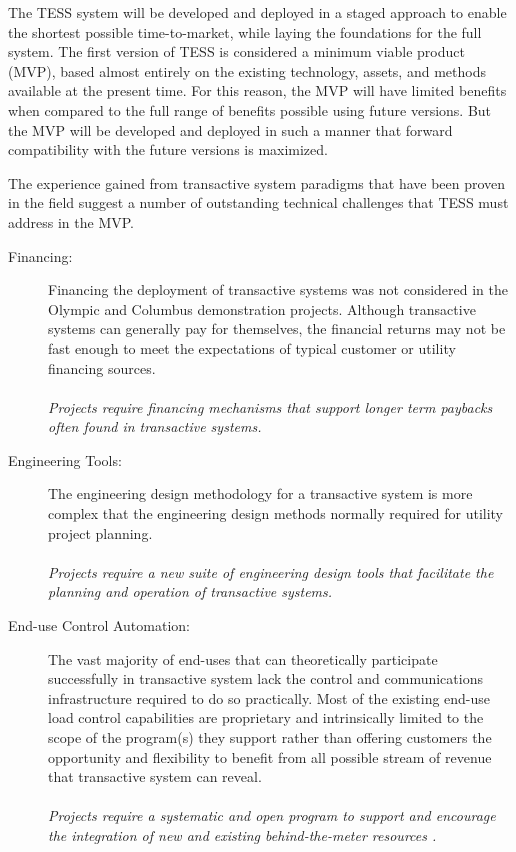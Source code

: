 \documentclass[10pt,twocolumn]{article}
\begin{document}
The TESS system will be developed and deployed in a staged approach to enable the shortest possible time-to-market, while laying the foundations for the full system.  The first version of TESS is considered a minimum viable product (MVP), based almost entirely on the existing technology, assets, and methods available at the present time. For this reason, the MVP will have limited benefits when compared to the full range of benefits possible using future versions.  But the MVP will be developed and deployed in such a manner that forward compatibility with the future versions is maximized.

The experience gained from transactive system paradigms that have been proven in the field suggest a number of outstanding technical challenges that TESS must address in the MVP.  

\begin{description}

    \item[Financing:] Financing the deployment of transactive systems was not considered in the Olympic and Columbus demonstration projects. Although transactive systems can generally pay for themselves, the financial returns may not be fast enough to meet the expectations of typical customer or utility financing sources. 
    \\~\\
    \textit{Projects require financing mechanisms that support longer term paybacks often found in transactive systems.}

    \item[Engineering Tools:] The engineering design methodology for a transactive system is more complex that the engineering design methods normally required for utility project planning.  
    \\~\\
    \textit{Projects require a new suite of engineering design tools that facilitate the planning and operation of transactive systems.}

    \item[End-use Control Automation:] The vast majority of end-uses that can theoretically participate successfully in transactive system lack the control and communications infrastructure required to do so practically. Most of the existing end-use load control capabilities are proprietary and intrinsically limited to the scope of the program(s) they support rather than offering customers the opportunity and flexibility to benefit from all possible stream of revenue that transactive system can reveal.  
    \\~\\
    \textit{Projects require a systematic and open program to support and encourage the integration of new and existing behind-the-meter resources .}


\end{description}
\end{document}
